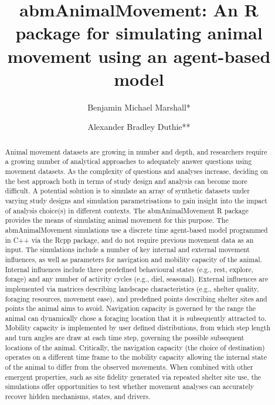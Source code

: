 \documentclass[10pt,a4paper]{article}
\begin{document}
\pagestyle{fancy}

\title{abmAnimalMovement: An R package for simulating animal movement using an agent-based model}
\author[1]{Benjamin Michael Marshall*}
\author[1]{Alexander Bradley Duthie**}


\maketitle
\thispagestyle{fancy}

\begin{abstract}

Animal movement datasets are growing in number and depth, and researchers require a growing number of analytical approaches to adequately answer questions using movement datasets. As the complexity of questions and analyses increase, deciding on the best approach both in terms of study design and analysis can become more difficult. A potential solution is to simulate an array of synthetic datasets under varying study designs and simulation parametrisations to gain insight into the impact of analysis choice(s) in different contexts. The abmAnimalMovement R package provides the means of simulating animal movement for this purpose. The abmAnimalMovement simulations use a discrete time agent-based model programmed in C++ via the Rcpp package, and do not require previous movement data as an input. The simulations include a number of key internal and external movement influences, as well as parameters for navigation and mobility capacity of the animal. Internal influences include three predefined behavioural states (e.g., rest, explore, forage) and any number of activity cycles (e.g., diel, seasonal). External influences are implemented via matrices describing landscape characteristics (e.g., shelter quality, foraging resources, movement ease), and predefined points describing shelter sites and points the animal aims to avoid. Navigation capacity is governed by the range the animal can dynamically chose a foraging location that it is subsequently attracted to. Mobility capacity is implemented by user defined distributions, from which step length and turn angles are draw at each time step, governing the possible subsequent locations of the animal. Critically, the navigation capacity (the choice of destination) operates on a different time frame to the mobility capacity allowing the internal state of the animal to differ from the observed movements. When combined with other emergent properties, such as site fidelity generated via repeated shelter site use, the simulations offer opportunities to test whether movement analyses can accurately recover hidden mechanisms, states, and drivers.

\end{abstract}
\end{document}
